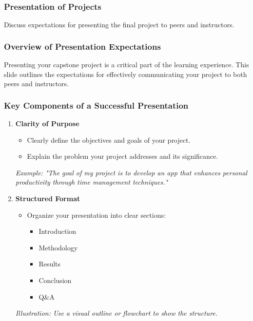 \documentclass[aspectratio=169]{beamer}
\begin{document}
\begin{frame}[fragile]
  \frametitle{Presentation of Projects}
  Discuss expectations for presenting the final project to peers and instructors.
\end{frame}

\begin{frame}[fragile]
  \frametitle{Overview of Presentation Expectations}
  Presenting your capstone project is a critical part of the learning experience. 
  This slide outlines the expectations for effectively communicating your project to both peers and instructors.
\end{frame}

\begin{frame}[fragile]
  \frametitle{Key Components of a Successful Presentation}
  \begin{enumerate}
    \item \textbf{Clarity of Purpose}
      \begin{itemize}
        \item Clearly define the objectives and goals of your project.
        \item Explain the problem your project addresses and its significance.
      \end{itemize}
      \textit{Example: "The goal of my project is to develop an app that enhances personal productivity through time management techniques."}
    
    \item \textbf{Structured Format}
      \begin{itemize}
        \item Organize your presentation into clear sections:
          \begin{itemize}
            \item Introduction
            \item Methodology
            \item Results
            \item Conclusion
            \item Q\&A
          \end{itemize}
      \end{itemize}
      \textit{Illustration: Use a visual outline or flowchart to show the structure.}
  \end{enumerate}
\end{frame}
\end{document}
